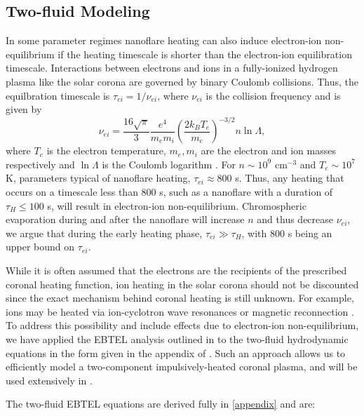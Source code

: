 \documentclass[apj]{emulateapj}
\begin{document}
	\subsection{Two-fluid Modeling}
	\label{subsec:two_fluid_theory}
	\par In some parameter regimes nanoflare heating can also induce electron-ion non-equilibrium if the heating timescale is shorter than the electron-ion equilibration timescale. Interactions between electrons and ions in a fully-ionized hydrogen plasma like the solar corona are governed by binary Coulomb collisions. Thus, the equilbration timescale is $\tau_{ei}=1/\nu_{ei}$, where $\nu_{ei}$ is the collision frequency and is given by
	\begin{equation}
		\nu_{ei} = \frac{16\sqrt{\pi}}{3}\frac{e^4}{m_em_i}\left(\frac{2k_BT_e}{m_e}\right)^{-3/2}n\ln{\Lambda},
	\end{equation}
	where $T_e$ is the electron temperature, $m_e,m_i$ are the electron and ion masses respectively and $\ln{\Lambda}$ is the Coulomb logarithm \citep[see Eq. 2.5e and Section 3 of][]{braginskii_transport_1965}. For $n\sim10^9$ cm$^{-3}$ and $T_e\sim10^{7}$ K, parameters typical of nanoflare heating, $\tau_{ei}\approx800$ s. Thus, any heating that occurs on a timescale less than 800 s, such as a nanoflare with a duration of $\tau_H\le100$ s, will result in electron-ion non-equilibrium. Chromospheric evaporation during and after the nanoflare will increase $n$ and thus decrease $\nu_{ei}$, we argue that during the early heating phase, $\tau_{ei}\gg\tau_H$, with 800 s being an upper bound on $\tau_{ei}$. 
	\par While it is often assumed that the electrons are the recipients of the prescribed coronal heating function, ion heating in the solar corona should not be discounted since the exact mechanism behind coronal heating is still unknown. For example, ions may be heated via ion-cyclotron wave resonances \citep{markovskii_intermittent_2004} or magnetic reconnection \citep{ono_ion_1996,drake_onset_2014}. To address this possibility and include effects due to electron-ion non-equilibrium, we have applied the EBTEL analysis outlined in \citet{klimchuk_highly_2008} to the two-fluid hydrodynamic equations in the form given in the appendix of \citet{bradshaw_influence_2013}. Such an approach allows us to efficiently model a two-component impulsively-heated coronal plasma, and will be used extensively in .
	\par The two-fluid EBTEL equations are derived fully in \autoref{appendix} and are:
\end{document}
